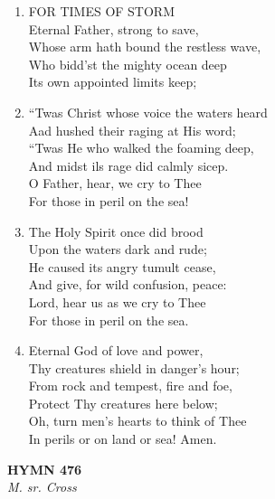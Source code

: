 \documentclass[11pt,a4paper]{article}
\begin{document}
\begin{enumerate}
    \item FOR TIMES OF STORM \\
        Eternal Father, strong to save, \\
        Whose arm hath bound the restless wave, \\
        Who bidd'st the mighty ocean deep \\
        Its own appointed limits keep;

    \item ``Twas Christ whose voice the waters heard \\
        Aad hushed their raging at His word; \\
        ``Twas He who walked the foaming deep, \\
        And midst ils rage did calmly sicep. \\
        O Father, hear, we cry to Thee \\
        For those in peril on the sea!

    \item The Holy Spirit once did brood \\
        Upon the waters dark and rude; \\
        He caused its angry tumult cease, \\
        And give, for wild confusion, peace: \\
        Lord, hear us as we cry to Thee \\
        For those in peril on the sea.

    \item Eternal God of love and power, \\
        Thy creatures shield in danger's hour; \\
        From rock and tempest, fire and foe, \\
        Protect Thy creatures here below; \\
        Oh, turn men's hearts to think of Thee \\
        In perils or on land or sea! Amen.

\end{enumerate}

\newpage
\begin{center}
    {\Large \textbf{HYMN 476}}
    \\
    \textit{M. sr. Cross}
\end{center}
\vspace{1em}
\end{document}
